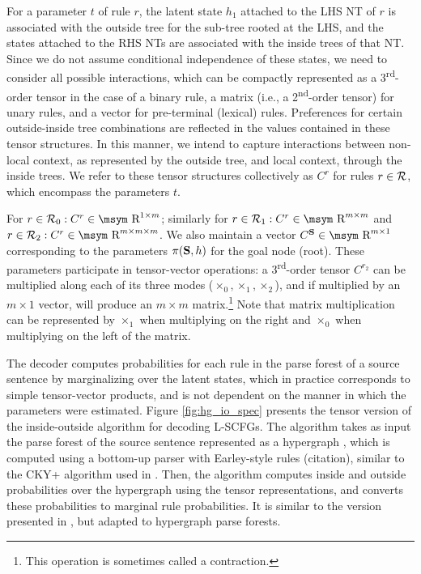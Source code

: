 \documentclass[11pt]{article}
\newcommand{\ts}{\textsuperscript}
\newcommand{\rules}{{\cal R}}
\newcommand{\bS}{{\bf S}}
\newcommand{\reals}{\mbox{\msym R}}
\begin{document}
For a parameter $t$ of rule $r$, the latent state $h_1$ attached to the LHS NT of $r$ is associated with the outside tree for the sub-tree rooted at the LHS, and the states attached to the RHS NTs are associated with the inside trees of that NT.    
Since we do not assume conditional independence of these states, we need to consider all possible interactions, which can be compactly represented as a 3\ts{rd}-order tensor in the case of a binary rule, a matrix (i.e., a 2\ts{nd}-order tensor) for unary rules, and a vector for pre-terminal (lexical) rules.  
Preferences for certain outside-inside tree combinations are reflected in the values contained in these tensor structures.  
In this manner, we intend to capture interactions between non-local context, as represented by the outside tree, and local context, through the inside trees. 
We refer to these tensor structures collectively as $C^r$ for rules $r \in \rules$, which encompass the parameters $t$.  

For $r \in \rules_0: C^r \in \reals^{1 \times m}$; similarly for $r \in \rules_1: C^r \in \reals^{m \times m}$ and $r \in \rules_2: C^r \in \reals^{m \times m \times m}$.
We also maintain a vector $C^\bS \in \reals^{m \times 1}$ corresponding to the parameters $\pi(\bS, h)$ for the goal node (root).   
These parameters participate in tensor-vector operations: a 3\ts{rd}-order tensor $C^{r_2}$ can be multiplied along each of its three modes ($\times_0, \times_1, \times_2$), and if multiplied by an $m \times 1$ vector, will produce an $m \times m$ matrix.\footnote{This operation is sometimes called a contraction.}
Note that matrix multiplication can be represented by $\times_1$ when multiplying on the right and $\times_0$ when multiplying on the left of the matrix.  

The decoder computes probabilities for each rule in the parse forest of a source sentence by marginalizing over the latent states, which in practice corresponds to simple tensor-vector products, and is not dependent on the manner in which the parameters were estimated. 
Figure \ref{fig:hg_io_spec} presents the tensor version of the inside-outside algorithm for decoding L-SCFGs. 
The algorithm takes as input the parse forest of the source sentence represented as a hypergraph \cite{Klein2001}, which is computed using a bottom-up parser with Earley-style rules (citation), similar to the CKY+ algorithm used in .  
Then, the algorithm computes inside and outside probabilities over the hypergraph using the tensor representations, and converts these probabilities to marginal rule probabilities.  
It is similar to the version presented in , but adapted to hypergraph parse forests. 
 
\end{document}
